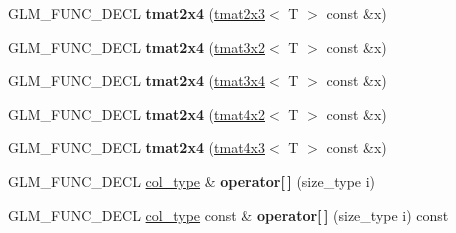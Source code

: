 \begin{DoxyCompactItemize}
\item 
\hypertarget{structglm_1_1detail_1_1tmat2x4_ae89c333a2d8ff59ee57d6db90eb549b6}{\-G\-L\-M\-\_\-\-F\-U\-N\-C\-\_\-\-D\-E\-C\-L {\bfseries tmat2x4} (\hyperlink{structglm_1_1detail_1_1tmat2x3}{tmat2x3}$<$ \-T $>$ const \&x)}\label{structglm_1_1detail_1_1tmat2x4_ae89c333a2d8ff59ee57d6db90eb549b6}

\item 
\hypertarget{structglm_1_1detail_1_1tmat2x4_a665779edf1cac193aed821ff05194221}{\-G\-L\-M\-\_\-\-F\-U\-N\-C\-\_\-\-D\-E\-C\-L {\bfseries tmat2x4} (\hyperlink{structglm_1_1detail_1_1tmat3x2}{tmat3x2}$<$ \-T $>$ const \&x)}\label{structglm_1_1detail_1_1tmat2x4_a665779edf1cac193aed821ff05194221}

\item 
\hypertarget{structglm_1_1detail_1_1tmat2x4_abbffc2c8f438c5f88492409464c740dc}{\-G\-L\-M\-\_\-\-F\-U\-N\-C\-\_\-\-D\-E\-C\-L {\bfseries tmat2x4} (\hyperlink{structglm_1_1detail_1_1tmat3x4}{tmat3x4}$<$ \-T $>$ const \&x)}\label{structglm_1_1detail_1_1tmat2x4_abbffc2c8f438c5f88492409464c740dc}

\item 
\hypertarget{structglm_1_1detail_1_1tmat2x4_a351ada68df993ecacb0231336343349b}{\-G\-L\-M\-\_\-\-F\-U\-N\-C\-\_\-\-D\-E\-C\-L {\bfseries tmat2x4} (\hyperlink{structglm_1_1detail_1_1tmat4x2}{tmat4x2}$<$ \-T $>$ const \&x)}\label{structglm_1_1detail_1_1tmat2x4_a351ada68df993ecacb0231336343349b}

\item 
\hypertarget{structglm_1_1detail_1_1tmat2x4_a7439245d46764ee7d9785acda1d19ff2}{\-G\-L\-M\-\_\-\-F\-U\-N\-C\-\_\-\-D\-E\-C\-L {\bfseries tmat2x4} (\hyperlink{structglm_1_1detail_1_1tmat4x3}{tmat4x3}$<$ \-T $>$ const \&x)}\label{structglm_1_1detail_1_1tmat2x4_a7439245d46764ee7d9785acda1d19ff2}

\item 
\hypertarget{structglm_1_1detail_1_1tmat2x4_a89badeff7eb525e6ffa0f024d2f183bc}{\-G\-L\-M\-\_\-\-F\-U\-N\-C\-\_\-\-D\-E\-C\-L \hyperlink{structglm_1_1detail_1_1tvec4}{col\-\_\-type} \& {\bfseries operator\mbox{[}$\,$\mbox{]}} (size\-\_\-type i)}\label{structglm_1_1detail_1_1tmat2x4_a89badeff7eb525e6ffa0f024d2f183bc}

\item 
\hypertarget{structglm_1_1detail_1_1tmat2x4_ad5c0e482eaa56f65ba4faa69d142d15e}{\-G\-L\-M\-\_\-\-F\-U\-N\-C\-\_\-\-D\-E\-C\-L \hyperlink{structglm_1_1detail_1_1tvec4}{col\-\_\-type} const \& {\bfseries operator\mbox{[}$\,$\mbox{]}} (size\-\_\-type i) const }\label{structglm_1_1detail_1_1tmat2x4_ad5c0e482eaa56f65ba4faa69d142d15e}


\end{DoxyCompactItemize}
